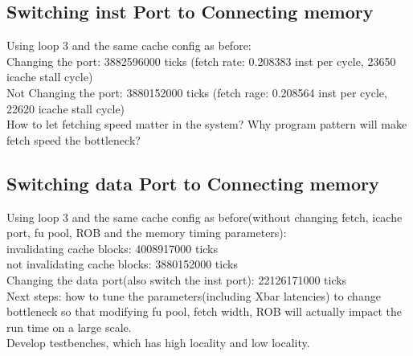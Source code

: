 \documentclass[11pt]{article}
\begin{document}
\subsection{Switching inst Port to Connecting memory}
Using loop 3 and the same cache config as before:\\

Changing the port: 3882596000 ticks (fetch rate: 0.208383 inst per cycle, 23650 icache stall cycle)\\

Not Changing the port: 3880152000 ticks (fetch rage: 0.208564 inst per cycle, 22620 icache stall cycle)\\

How to let fetching speed matter in the system? Why program pattern will make fetch speed the bottleneck?\\

\subsection{Switching data Port to Connecting memory}
Using loop 3 and the same cache config as before(without changing fetch, icache port, fu pool, ROB and the memory timing parameters):\\

invalidating cache blocks: 4008917000 ticks\\

not invalidating cache blocks: 3880152000 ticks\\

Changing the data port(also switch the inst port): 22126171000 ticks\\

Next steps: how to tune the parameters(including Xbar latencies) to change bottleneck so that modifying fu pool, fetch width, ROB will actually impact the run time on a large scale.\\

Develop testbenches, which has high locality and low locality.\\  
\end{document}
